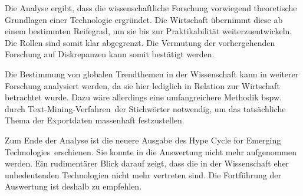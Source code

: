 Die Analyse ergibt, dass die wissenschaftliche Forschung vorwiegend theoretische Grundlagen einer Technologie ergründet. Die Wirtschaft übernimmt diese ab einem bestimmten Reifegrad, um sie bis zur Praktikabilität weiterzuentwickeln. Die Rollen sind somit klar abgegrenzt. Die Vermutung der vorhergehenden Forschung auf Diskrepanzen kann somit bestätigt werden.

Die Bestimmung von globalen Trendthemen in der Wissenschaft kann in weiterer Forschung analysiert werden, da sie hier lediglich in Relation zur Wirtschaft betrachtet wurde. Dazu wäre allerdings eine umfangreichere Methodik bspw. durch \glqq Text-Mining-Verfahren\grqq~der Stichwörter notwendig, um das tatsächliche Thema der Exportdaten massenhaft festzustellen.

Zum Ende der Analyse ist die neuere Ausgabe des \glqq Hype Cycle for Emerging Technologies\grqq~erschienen. Sie konnte in die Auswertung nicht mehr aufgenommen werden. Ein rudimentärer Blick darauf zeigt, dass die in der Wissenschaft eher unbedeutenden Technologien nicht mehr vertreten sind. Die Fortführung der Auswertung ist deshalb zu empfehlen.